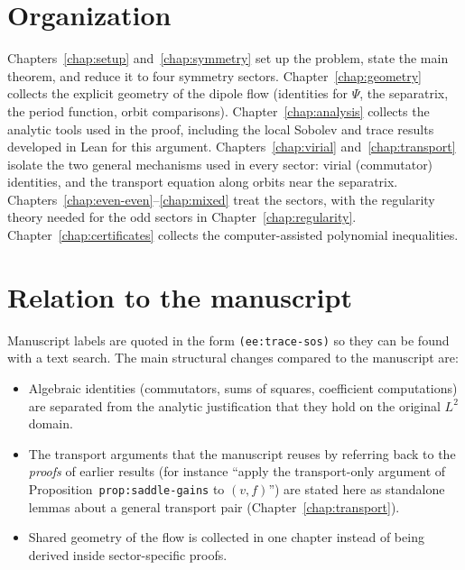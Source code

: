\section*{Organization}

Chapters~\ref{chap:setup} and~\ref{chap:symmetry} set up the problem, state the
main theorem, and reduce it to four symmetry sectors.
Chapter~\ref{chap:geometry} collects the explicit geometry of the dipole flow
(identities for $\Psi$, the separatrix, the period function, orbit
comparisons). Chapter~\ref{chap:analysis} collects the analytic tools used
in the proof, including the local Sobolev and trace results developed in
Lean for this argument.
Chapters~\ref{chap:virial} and~\ref{chap:transport} isolate the two general
mechanisms used in every sector: virial (commutator) identities, and the
transport equation along orbits near the separatrix.
Chapters~\ref{chap:even-even}--\ref{chap:mixed} treat the sectors, with the
regularity theory needed for the odd sectors in Chapter~\ref{chap:regularity}.
Chapter~\ref{chap:certificates} collects the computer-assisted polynomial
inequalities.

\section*{Relation to the manuscript}

Manuscript labels are quoted in the form \texttt{(ee:trace-sos)} so they can
be found with a text search. The main structural changes compared to the
manuscript are:
\begin{itemize}
  \item Algebraic identities (commutators, sums of squares, coefficient
        computations) are separated from the analytic justification that
        they hold on the original $L^2$ domain.
  \item The transport arguments that the manuscript reuses by referring back
        to the \emph{proofs} of earlier results (for instance
        ``apply the transport-only argument of
        Proposition~\texttt{prop:saddle-gains} to $(v,f)$'') are stated here as
        standalone lemmas about a general transport pair
        (Chapter~\ref{chap:transport}).
  \item Shared geometry of the flow is collected in one chapter instead of
        being derived inside sector-specific proofs.
\end{itemize}
